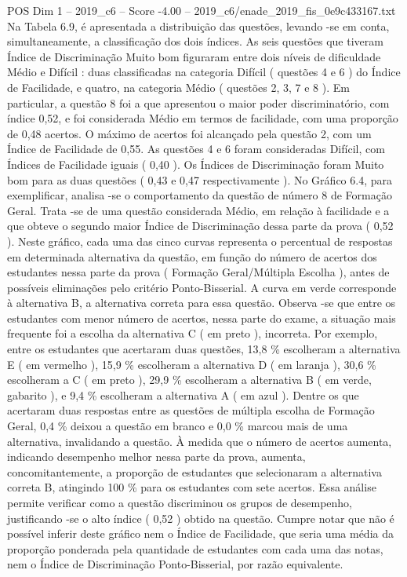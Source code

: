 \begin{textsample}{POS Dim 1 – 2019\_c6 – Score -4.00 – 2019\_c6/enade\_2019\_fis\_0e9c433167.txt}
Na Tabela 6.9, é apresentada a distribuição das questões, levando -se em conta, simultaneamente, a classificação dos dois índices.
As seis questões que tiveram Índice de Discriminação Muito bom figuraram entre dois níveis de dificuldade Médio e Difícil : duas classificadas na categoria Difícil ( questões 4 e 6 ) do Índice de Facilidade, e quatro, na categoria Médio ( questões 2, 3, 7 e 8 ).
Em particular, a questão 8 foi a que apresentou o maior poder discriminatório, com índice 0,52, e foi considerada Médio em termos de facilidade, com uma proporção de 0,48 acertos.
O máximo de acertos foi alcançado pela questão 2, com um Índice de Facilidade de 0,55.
As questões 4 e 6 foram consideradas Difícil, com Índices de Facilidade iguais ( 0,40 ).
Os Índices de Discriminação foram Muito bom para as duas questões ( 0,43 e 0,47 respectivamente ).
No Gráfico 6.4, para exemplificar, analisa -se o comportamento da questão de número 8 de Formação Geral.
Trata -se de uma questão considerada Médio, em relação à facilidade e a que obteve o segundo maior Índice de Discriminação dessa parte da prova ( 0,52 ).
Neste gráfico, cada uma das cinco curvas representa o percentual de respostas em determinada alternativa da questão, em função do número de acertos dos estudantes nessa parte da prova ( Formação Geral/Múltipla Escolha ), antes de possíveis eliminações pelo critério Ponto-Bisserial.
A curva em verde corresponde à alternativa B, a alternativa correta para essa questão.
Observa -se que entre os estudantes com menor número de acertos, nessa parte do exame, a situação mais frequente foi a escolha da alternativa C ( em preto ), incorreta.
Por exemplo, entre os estudantes que acertaram duas questões, 13,8 \% escolheram a alternativa E ( em vermelho ), 15,9 \% escolheram a alternativa D ( em laranja ), 30,6 \% escolheram a C ( em preto ), 29,9 \% escolheram a alternativa B ( em verde, gabarito ), e 9,4 \% escolheram a alternativa A ( em azul ).
Dentre os que acertaram duas respostas entre as questões de múltipla escolha de Formação Geral, 0,4 \% deixou a questão em branco e 0,0 \% marcou mais de uma alternativa, invalidando a questão.
À medida que o número de acertos aumenta, indicando desempenho melhor nessa parte da prova, aumenta, concomitantemente, a proporção de estudantes que selecionaram a alternativa correta B, atingindo 100 \% para os estudantes com sete acertos.
Essa análise permite verificar como a questão discriminou os grupos de desempenho, justificando -se o alto índice ( 0,52 ) obtido na questão.
Cumpre notar que não é possível inferir deste gráfico nem o Índice de Facilidade, que seria uma média da proporção ponderada pela quantidade de estudantes com cada uma das notas, nem o Índice de Discriminação Ponto-Bisserial, por razão equivalente.

\end{textsample}
